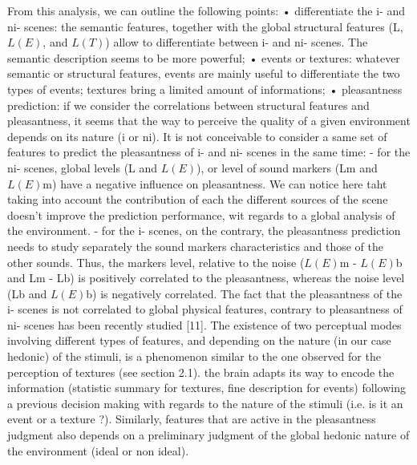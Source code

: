 From this analysis, we can outline the following points: • differentiate the i- and ni- scenes: the semantic features, together with the global structural features (L, $L(E)$, and $L(T)$) allow to differentiate between i- and ni- scenes. The semantic description seems to be more powerful; • events or textures: whatever semantic or structural features, events are mainly useful to differentiate the two types of events; textures bring a limited amount of informations; • pleasantness prediction: if we consider the correlations between structural features and pleasantness, it seems that the way to perceive the quality of a given environment depends on its nature (i or ni). It is not conceivable to consider a same set of features to predict the pleasantness of i- and ni- scenes in the same time: - for the ni- scenes, global levels (L and $L(E)$), or level of sound markers (Lm and $L(E)$m) have a negative influence on pleasantness. We can notice here taht taking into account the contribution of each the different sources of the scene doesn’t improve the prediction performance, wit regards to a global analysis of the environment. - for the i- scenes, on the contrary, the pleasantness prediction needs to study separately the sound markers characteristics and those of the other sounds. Thus, the markers level, relative to the noise ($L(E)$m - $L(E)$b and Lm - Lb) is positively correlated to the pleasantness, whereas the noise level (Lb and $L(E)$b) is negatively correlated. The fact that the pleasantness of the i- scenes is not correlated to global physical features, contrary to pleasantness of ni- scenes has been recently studied [11].
The existence of two perceptual modes involving different types of features, and depending on the nature (in our case hedonic) of the stimuli, is a phenomenon similar to the one observed for the perception of textures (see section 2.1). the brain adapts its way to encode the information (statistic summary for textures, fine description for events) following a previous decision making with regards to the nature of the stimuli (i.e. is it an event or a texture ?). Similarly, features that are active in the pleasantness judgment also depends on a preliminary judgment of the global hedonic nature of the environment (ideal or non ideal).
